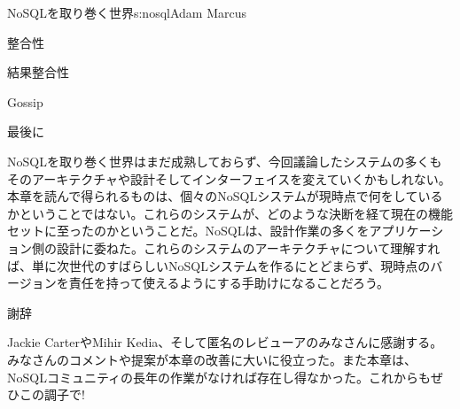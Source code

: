 \begin{aosachapter}{NoSQLを取り巻く世界}{s:nosql}{Adam Marcus}
\begin{aosasect1}{整合性}
\begin{aosasect2}{結果整合性}
\begin{aosasect3}{Gossip}
\end{aosasect3}

\end{aosasect2}

\end{aosasect1}

\begin{aosasect1}{最後に}

NoSQLを取り巻く世界はまだ成熟しておらず、今回議論したシステムの多くもそのアーキテクチャや設計そしてインターフェイスを変えていくかもしれない。本章を読んで得られるものは、個々のNoSQLシステムが現時点で何をしているかということではない。これらのシステムが、どのような決断を経て現在の機能セットに至ったのかということだ。NoSQLは、設計作業の多くをアプリケーション側の設計に委ねた。これらのシステムのアーキテクチャについて理解すれば、単に次世代のすばらしいNoSQLシステムを作るにとどまらず、現時点のバージョンを責任を持って使えるようにする手助けになることだろう。

\end{aosasect1}

\begin{aosasect1}{謝辞}

Jackie CarterやMihir Kedia、そして匿名のレビューアのみなさんに感謝する。みなさんのコメントや提案が本章の改善に大いに役立った。また本章は、NoSQLコミュニティの長年の作業がなければ存在し得なかった。これからもぜひこの調子で!

\end{aosasect1}

\end{aosachapter}
